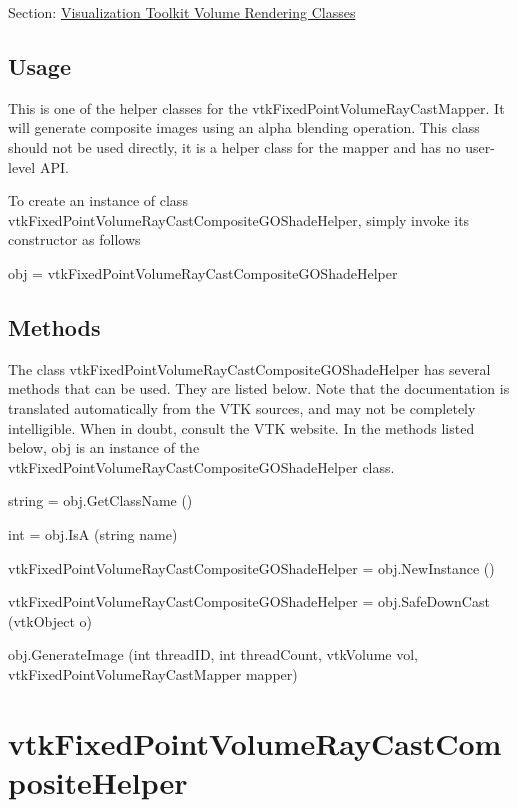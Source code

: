 Section\-: \hyperlink{sec_vtkvolumerendering}{Visualization Toolkit Volume Rendering Classes} \hypertarget{vtkwidgets_vtkxyplotwidget_Usage}{}\subsection{Usage}\label{vtkwidgets_vtkxyplotwidget_Usage}
This is one of the helper classes for the vtk\-Fixed\-Point\-Volume\-Ray\-Cast\-Mapper. It will generate composite images using an alpha blending operation. This class should not be used directly, it is a helper class for the mapper and has no user-\/level A\-P\-I.

To create an instance of class vtk\-Fixed\-Point\-Volume\-Ray\-Cast\-Composite\-G\-O\-Shade\-Helper, simply invoke its constructor as follows \begin{DoxyVerb}  obj = vtkFixedPointVolumeRayCastCompositeGOShadeHelper
\end{DoxyVerb}
 \hypertarget{vtkwidgets_vtkxyplotwidget_Methods}{}\subsection{Methods}\label{vtkwidgets_vtkxyplotwidget_Methods}
The class vtk\-Fixed\-Point\-Volume\-Ray\-Cast\-Composite\-G\-O\-Shade\-Helper has several methods that can be used. They are listed below. Note that the documentation is translated automatically from the V\-T\-K sources, and may not be completely intelligible. When in doubt, consult the V\-T\-K website. In the methods listed below, {\ttfamily obj} is an instance of the vtk\-Fixed\-Point\-Volume\-Ray\-Cast\-Composite\-G\-O\-Shade\-Helper class. 
\begin{DoxyItemize}
\item {\ttfamily string = obj.\-Get\-Class\-Name ()}  
\item {\ttfamily int = obj.\-Is\-A (string name)}  
\item {\ttfamily vtk\-Fixed\-Point\-Volume\-Ray\-Cast\-Composite\-G\-O\-Shade\-Helper = obj.\-New\-Instance ()}  
\item {\ttfamily vtk\-Fixed\-Point\-Volume\-Ray\-Cast\-Composite\-G\-O\-Shade\-Helper = obj.\-Safe\-Down\-Cast (vtk\-Object o)}  
\item {\ttfamily obj.\-Generate\-Image (int thread\-I\-D, int thread\-Count, vtk\-Volume vol, vtk\-Fixed\-Point\-Volume\-Ray\-Cast\-Mapper mapper)}  
\end{DoxyItemize}\hypertarget{vtkvolumerendering_vtkfixedpointvolumeraycastcompositehelper}{}\section{vtk\-Fixed\-Point\-Volume\-Ray\-Cast\-Composite\-Helper}\label{vtkvolumerendering_vtkfixedpointvolumeraycastcompositehelper}
